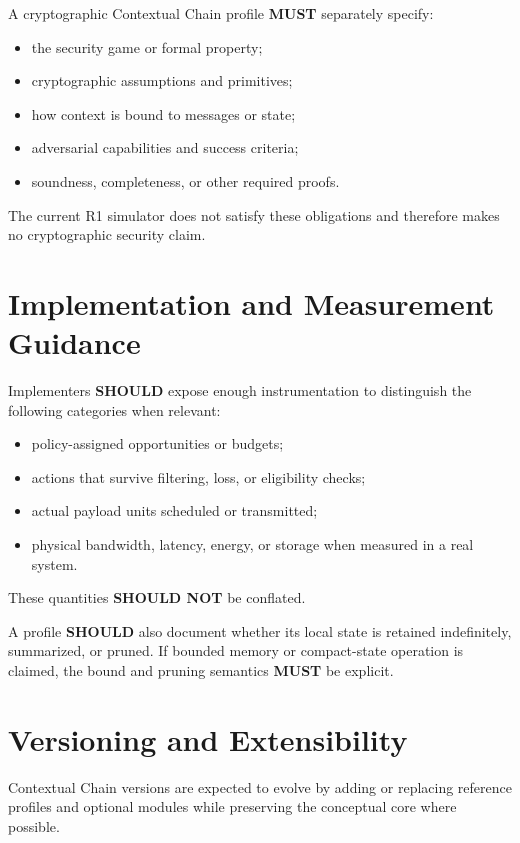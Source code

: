 \documentclass[11pt]{article}
\begin{document}
A cryptographic Contextual Chain profile \textbf{MUST} separately specify:
\begin{itemize}
  \item the security game or formal property;
  \item cryptographic assumptions and primitives;
  \item how context is bound to messages or state;
  \item adversarial capabilities and success criteria;
  \item soundness, completeness, or other required proofs.
\end{itemize}
The current R1 simulator does not satisfy these obligations and therefore makes no cryptographic
security claim.

\section{Implementation and Measurement Guidance}
Implementers \textbf{SHOULD} expose enough instrumentation to distinguish the following
categories when relevant:
\begin{itemize}
  \item policy-assigned opportunities or budgets;
  \item actions that survive filtering, loss, or eligibility checks;
  \item actual payload units scheduled or transmitted;
  \item physical bandwidth, latency, energy, or storage when measured in a real system.
\end{itemize}
These quantities \textbf{SHOULD NOT} be conflated.

A profile \textbf{SHOULD} also document whether its local state is retained indefinitely,
summarized, or pruned. If bounded memory or compact-state operation is claimed, the bound and
pruning semantics \textbf{MUST} be explicit.

\section{Versioning and Extensibility}
Contextual Chain versions are expected to evolve by adding or replacing reference profiles and
optional modules while preserving the conceptual core where possible.
\end{document}
